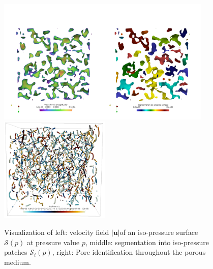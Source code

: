 \documentclass[draft]{agujournal2019}
\begin{document}
\begin{figure}[htbp!]\label{fig:segmentation}
\includegraphics[height=6cm]{figures/semgentation_veloctiy_iso_p_surface.png}
\includegraphics[height=5cm]{figures/pores_PM2.png}
\caption{Visualization of left: velocity field $|\mathbf{u}|$of an iso-pressure surface $\mathcal{S}(p)$ at pressure value $p$, middle: segmentation into iso-pressure patches  $\mathcal{S}_i(p)$, right: Pore identification throughout the porous medium. }
\end{figure}
\end{document}
